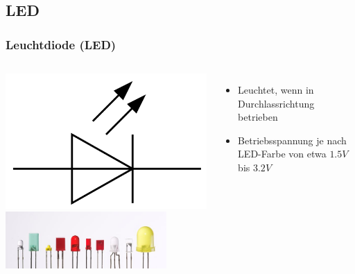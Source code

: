\subsection*{LED}
\begin{frame}
  \frametitle{Leuchtdiode (LED)}
  \begin{columns}[c]
    \begin{center}
      \includegraphics[width=1\textwidth,height=.3\textheight,keepaspectratio]{a05/Symbol_LED.png}\\
      \includegraphics[width=0.8\textwidth,height=.55\textheight,keepaspectratio]{a05/Verschiedene_LEDs.jpg}
      \tiny \hyperlink{refs}{\cite{wm}}
    \end{center}
    \begin{itemize}
      \item Leuchtet, wenn in Durchlassrichtung betrieben
      \item Betriebsspannung je nach LED-Farbe von etwa $1.5V$ bis $3.2V$
    \end{itemize}
  \end{columns}
\end{frame}

